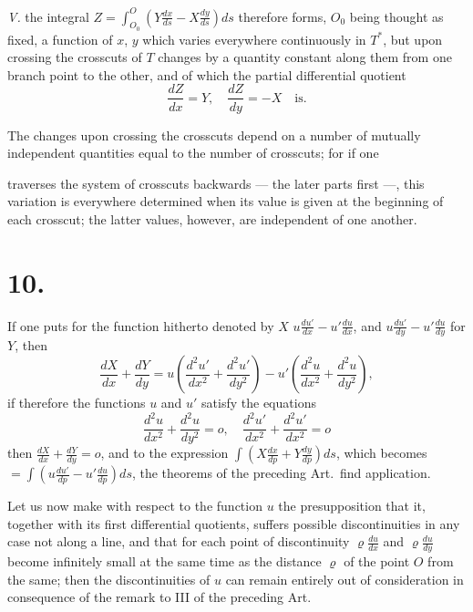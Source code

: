 \documentclass{article}
\begin{document}
\emph{V.} the integral $Z = \displaystyle\int_{O_0}^O \left(Y\frac{dx}{ds} - X\frac{dy}{ds}\right) ds$ therefore forms, $O_0$ being thought as fixed, a function of $x$, $y$ which varies everywhere continuously in $T^*$, but upon crossing the crosscuts of $T$ changes by a quantity constant along them from one branch point to the other, and of which the partial differential quotient
\[
\frac{dZ}{dx} = Y, \quad \frac{dZ}{dy} = -X \quad \text{is.}
\]

The changes upon crossing the crosscuts depend on a number of mutually independent quantities equal to the number of crosscuts; for if one

traverses the system of crosscuts backwards --- the later parts first ---, this variation is everywhere determined when its value is given at the beginning of each crosscut; the latter values, however, are independent of one another.

\section*{10.}

If one puts for the function hitherto denoted by $X$ $u\frac{du'}{dx} - u'\frac{du}{dx}$, and $u\frac{du'}{dy} - u'\frac{du}{dy}$ for $Y$, then
\[
\frac{dX}{dx} + \frac{dY}{dy} = u\left(\frac{d^2u'}{dx^2} + \frac{d^2u'}{dy^2}\right) - u'\left(\frac{d^2u}{dx^2} + \frac{d^2u}{dy^2}\right),
\]
if therefore the functions $u$ and $u'$ satisfy the equations
\[
\frac{d^2u}{dx^2} + \frac{d^2u}{dy^2} = o, \quad \frac{d^2u'}{dx^2} + \frac{d^2u'}{dx^2} = o
\]
then $\frac{dX}{dx} + \frac{dY}{dy} = o$, and to the expression $\displaystyle\int \left(X\frac{dx}{dp} + Y\frac{dy}{dp}\right) ds$, which becomes $= \displaystyle\int \left(u\frac{du'}{dp} - u'\frac{du}{dp}\right) ds$, the theorems of the preceding Art.\ find application.

Let us now make with respect to the function $u$ the presupposition that it, together with its first differential quotients, suffers possible discontinuities in any case not along a line, and that for each point of discontinuity $\varrho\frac{du}{dx}$ and $\varrho\frac{du}{dy}$ become infinitely small at the same time as the distance $\varrho$ of the point $O$ from the same; then the discontinuities of $u$ can remain entirely out of consideration in consequence of the remark to III of the preceding Art.
\end{document}
